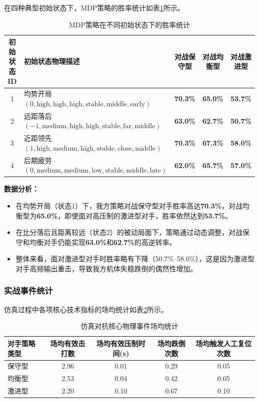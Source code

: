 \documentclass[a4paper,12pt]{article}
\numberwithin{equation}{section}
\numberwithin{table}{section}
\numberwithin{figure}{section}
\begin{document}
在四种典型初始状态下，MDP策略的胜率统计如表\ref{tab:winrate}所示。

\begin{table}[H]
    \centering
    \caption{MDP策略在不同初始状态下的胜率统计}
    \label{tab:winrate}
    \small
    \begin{tabular}{clccc}
        \toprule
        初始状态ID & 初始状态物理描述 & 对战保守型 & 对战均衡型 & 对战激进型 \\
        \midrule
        1 & 均势开局$(0, \text{high}, \text{high}, \text{high}, \text{stable}, \text{middle}, \text{early})$ & \textbf{70.3\%} & \textbf{65.0\%} & \textbf{53.7\%} \\
        2 & 远距落后$(-1, \text{medium}, \text{high}, \text{high}, \text{stable}, \text{far}, \text{middle})$ & \textbf{63.0\%} & \textbf{62.7\%} & \textbf{50.7\%} \\
        3 & 近距领先$(1, \text{high}, \text{medium}, \text{high}, \text{stable}, \text{close}, \text{middle})$ & \textbf{70.3\%} & \textbf{67.3\%} & \textbf{58.0\%} \\
        4 & 后期疲劳$(0, \text{medium}, \text{medium}, \text{low}, \text{stable}, \text{middle}, \text{late})$ & \textbf{62.0\%} & \textbf{65.7\%} & \textbf{57.0\%} \\
        \bottomrule
    \end{tabular}
\end{table}

\textbf{数据分析：}
\begin{itemize}
    \item 在均势开局（状态1）下，我方策略对战保守型对手胜率高达\textbf{70.3\%}，对战均衡型为\textbf{65.0\%}，即使面对高压制的激进型对手，胜率依然达到\textbf{53.7\%}。
    \item 在比分落后且距离较远（状态2）的被动局面下，策略通过动态调整，对战保守和均衡对手仍能实现\textbf{63.0\%}和\textbf{62.7\%}的高逆转率。
    \item 整体来看，面对激进型对手时胜率略有下降（50.7\%--58.0\%），这是因为激进型对手高频输出重击，导致我方机体失稳跌倒的偶然性增加。
\end{itemize}

\subsubsection{实战事件统计}

仿真过程中各项核心技术指标的场均统计如表\ref{tab:events}所示。

\begin{table}[H]
    \centering
    \caption{仿真对抗核心物理事件场均统计}
    \label{tab:events}
    \small
    \begin{tabular}{lcccc}
        \toprule
        对手策略类型 & 场均有效击打数 & 场均有效压制时间(s) & 场均跌倒次数 & 场均触发人工复位次数 \\
        \midrule
        保守型 & 2.96 & 0.01 & 0.29 & 0.05 \\
        均衡型 & 2.53 & 0.04 & 0.42 & 0.05 \\
        激进型 & 2.20 & 0.10 & 0.67 & 0.10 \\
        \bottomrule
    \end{tabular}
\end{table}
\end{document}
